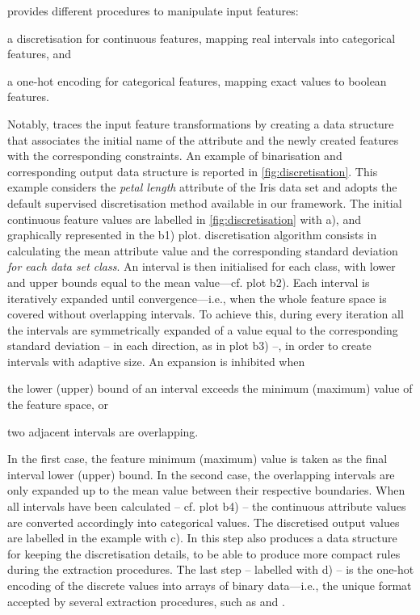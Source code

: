 \documentclass[12pt,a4paper,openright,twoside]{book}
\begin{document}
\psyke{} provides different procedures to manipulate input features:
%
\begin{inlinelist}
    \item a discretisation for continuous features, mapping real intervals into categorical features, and
    \item a one-hot encoding for categorical features, mapping exact values to boolean features.
\end{inlinelist}
%
Notably, \psyke{} traces the input feature transformations by creating a data structure that associates the initial name of the attribute and the newly created features with the corresponding constraints.
%
An example of \psyke{} binarisation and corresponding output data structure is reported in \cref{fig:discretisation}.
%
This example considers the \emph{petal length} attribute of the Iris data set and adopts the default supervised discretisation method available in our framework.
%
The initial continuous feature values are labelled in \cref{fig:discretisation} with a), and graphically represented in the b1) plot.
%
\psyke{} discretisation algorithm consists in calculating the mean attribute value and the corresponding standard deviation \emph{for each data set class}.
%
An interval is then initialised for each class, with lower and upper bounds equal to the mean value---cf. plot b2).
%
Each interval is iteratively expanded until convergence---i.e., when the whole feature space is covered without overlapping intervals.
%
To achieve this, during every iteration all the intervals are symmetrically expanded of a value equal to the corresponding standard deviation -- in each direction, as in plot b3) --, in order to create intervals with adaptive size.
%
An expansion is inhibited when
%
\begin{inlinelist}
    \item the lower (upper) bound of an interval exceeds the minimum (maximum) value of the feature space, or
    \item two adjacent intervals are overlapping.
\end{inlinelist}
%
In the first case, the feature minimum (maximum) value is taken as the final interval lower (upper) bound.
%
In the second case, the overlapping intervals are only expanded up to the mean value between their respective boundaries.
%
When all intervals have been calculated -- cf. plot b4) -- the continuous attribute values are converted accordingly into categorical values.
%
The discretised output values are labelled in the example with c).
%
In this step \psyke{} also produces a data structure for keeping the discretisation details, to be able to produce more compact rules during the extraction procedures.
%
The last step -- labelled with d) -- is the one-hot encoding of the discrete values into arrays of binary data---i.e., the unique format accepted by several extraction procedures, such as \real{} and \trepan{}.
\end{document}
